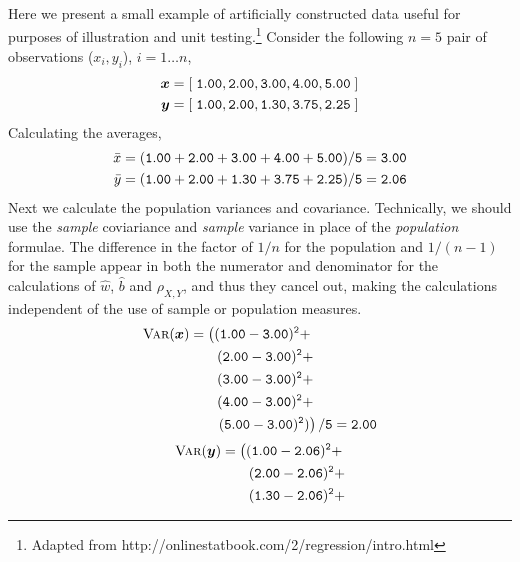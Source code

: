 \begin{Hexample}
{
Here we present a small example of artificially 
constructed data
useful for purposes of illustration and unit
testing.\footnote{Adapted from http://onlinestatbook.com/2/regression/intro.html}
Consider the following $n=5$ pair of observations
($x_i, y_i$), $i=1\ldots n$,
\begin{align}
\mbox{\boldmath $x$} & = {\tt [\; 1.00, 2.00, 3.00, 4.00, 5.00 \;]} \\
\mbox{\boldmath $y$} & = {\tt [\; 1.00, 2.00, 1.30, 3.75, 2.25 \;]}
\end{align}
Calculating the averages, 
\begin{align}
\bar{x} &= {\tt (1.00+2.00+3.00+4.00+5.00)/5 = 3.00 } \\
\bar{y} &= {\tt (1.00+2.00+1.30+3.75+2.25)/5 = 2.06 } 
\end{align}
Next we calculate the population variances and covariance.
Technically, we should use
the {\em sample} coviariance and {\em sample} variance 
in place of the {\em population} formulae.
The difference in the factor of $1/n$ for the population and
$1/(n-1)$ for the sample appear in both the numerator and
denominator for the calculations of $\hat{w}$, $\hat{b}$ and 
$\rho_{X,Y}$, and thus they cancel out, making the calculations
independent of the use of sample or population measures.
\begin{align}
\mbox{\sc Var}(\mbox{\boldmath $x$}) 
&= {\tt \left((1.00-3.00)^2 + \right.} \nonumber \\
& \hspace{0.7cm} {\tt (2.00-3.00)^2 + } \nonumber \\
& \hspace{0.7cm} {\tt (3.00-3.00)^2 + } \nonumber \\ 
& \hspace{0.7cm} {\tt (4.00-3.00)^2 + } \nonumber \\
& \hspace{0.7cm} {\tt \left.(5.00-3.00)^2)\right)/5
  = 2.00}  
\end{align}
\begin{align}
\var(\vy) 
&= {\tt \left((1.00-2.06)^2 + \right.} \nonumber \\
& \hspace{0.7cm} {\tt (2.00-2.06)^2 + } \nonumber \\
& \hspace{0.7cm} {\tt (1.30-2.06)^2 + } \nonumber \\ 

\end{align}}
\end{Hexample}

